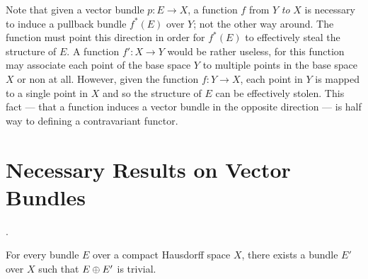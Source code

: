\documentclass[../sean_thesis.tex]{subfiles}
\begin{document}
Note that given a vector bundle $p: E \to X$, a function $f$ from $Y$ \emph{to} $X$ is necessary to induce a pullback bundle $f^{*}(E)$ over $Y$; not the other way around. The function must point this direction in order for $f^{*}(E)$ to effectively steal the structure of $E$. A function $f': X \to Y$ would be rather useless, for this function may associate each point of the base space $Y$ to multiple points in the base space $X$ or non at all. However, given the function $f: Y \to X$, each point in $Y$ is mapped to a single point in $X$ and so the structure of $E$ can be effectively stolen. This fact --- that a function induces a vector bundle in the opposite direction --- is half way to defining a contravariant functor.

%	

%
%		

%		

\section{Necessary Results on Vector Bundles}


.

\begin{claim}
	For every bundle $E$ over a compact Hausdorff space $X$, there exists a bundle $E'$ over $X$ such that $E \oplus E'$ is trivial.
\end{claim}
\end{document}

